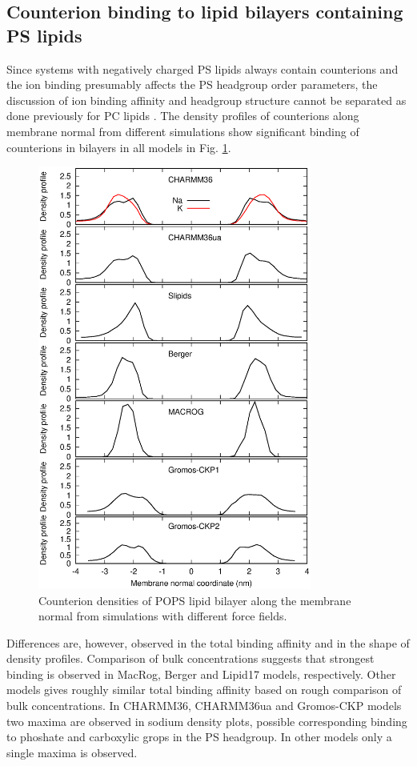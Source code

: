 \documentclass[aps,prl,superscriptaddress,twocolumn]{revtex4}
\begin{document}
\subsection{Counterion binding to lipid bilayers containing PS lipids}
Since systems with negatively charged PS lipids always contain counterions
and the ion binding presumably affects the PS headgroup
order parameters, the discussion of ion binding affinity and
headgroup structure cannot be separated as done previously
for PC lipids \cite{botan15,catte16}. The density profiles
of counterions along membrane normal from different simulations
show significant binding of counterions in bilayers in all
models in Fig. \ref{NAdensPOPS}.
\begin{figure}[]
  \centering
  \includegraphics[width=9.0cm]{../Figs/NAdensPOPS.eps}
  \caption{\label{NAdensPOPS}
    Counterion densities of POPS lipid bilayer along the membrane normal from
    simulations with different force fields.
  }
\end{figure}
Differences are, however,
observed in the total binding affinity and in the shape of density profiles.
Comparison of bulk concentrations suggests that strongest binding
is observed in MacRog, Berger and Lipid17 models, respectively.
Other models gives roughly similar total binding affinity
based on rough comparison of bulk concentrations.
In CHARMM36, CHARMM36ua and Gromos-CKP models two maxima are observed
in sodium density plots, possible corresponding binding to phoshate
and carboxylic grops in the PS headgroup. In other models only
a single maxima is observed. 
\end{document}
